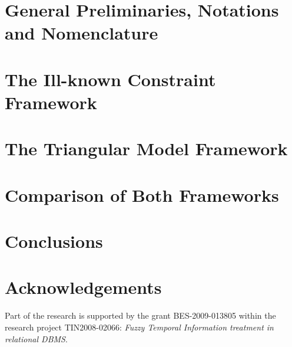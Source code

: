 \documentclass[twocolumn,a4paper]{article}
\theoremstyle{definition}
\begin{document}
\section{\label{sec:general-preliminaries}General Preliminaries, Notations and Nomenclature}


\section{\label{sec:ikc}The Ill-known Constraint Framework}


\section{\label{sec:tm}The Triangular Model Framework}


\section{\label{sec:proposal}Comparison of Both Frameworks}


\section{\label{sec:conclusions}Conclusions}

\vspace{-10pt}
\section*{Acknowledgements}
\vspace{-5pt}
Part of the research is supported by the grant BES-2009-013805 within the research project TIN2008-02066: \emph{Fuzzy Temporal Information treatment in relational DBMS}.



\vspace{-10pt}





\end{document}
